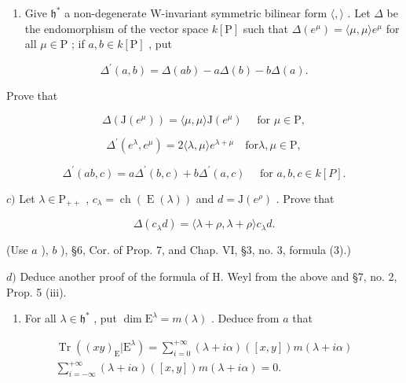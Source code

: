 \begin{enumerate}
\def\labelenumi{\alph{enumi})}
\setcounter{enumi}{1}
\tightlist
\item
  Give \(\mathfrak{h}^*\) a non-degenerate W-invariant symmetric bilinear form \(\langle ,\rangle\) . Let \(\Delta\) be the endomorphism of the vector space \(k[\mathrm{P}]\) such that \(\Delta(e^{\mu}) = \langle \mu ,\mu \rangle e^{\mu}\) for all \(\mu \in \mathrm{P}\) ; if \(a,b\in k[\mathrm{P}]\) , put
\end{enumerate}

\[
\Delta^ {\prime} (a, b) = \Delta (a b) - a \Delta (b) - b \Delta (a).
\]

Prove that

\[
\Delta (\mathrm{J} (e ^ {\mu})) = \langle \mu , \mu \rangle \mathrm{J} (e ^ {\mu}) \quad \text { for } \mu \in \mathrm{P},
\]

\[
\Delta^ {\prime} (e ^ {\lambda}, e ^ {\mu}) = 2 \langle \lambda , \mu \rangle e ^ {\lambda + \mu} \quad \mathrm{for} \lambda , \mu \in \mathrm{P},
\]

\[
\Delta^ {\prime} (a b, c) = a \Delta^ {\prime} (b, c) + b \Delta^ {\prime} (a, c) \quad \text { for } a, b, c \in k [ P ].
\]

\(c)\) Let \(\lambda \in \mathrm{P}_{++}\) , \(c_{\lambda} = \operatorname{ch}(\operatorname{E}(\lambda))\) and \(d = \mathrm{J}(e^{\rho})\) . Prove that

\[
\Delta (c _ {\lambda} d) = \langle \lambda + \rho , \lambda + \rho \rangle c _ {\lambda} d.
\]

(Use \(a\) ), \(b\) ), §6, Cor. of Prop. 7, and Chap. VI, §3, no. 3, formula (3).)

\(d)\) Deduce another proof of the formula of H. Weyl from the above and §7, no. 2, Prop. 5 (iii).

\begin{enumerate}
\def\labelenumi{\alph{enumi})}
\setcounter{enumi}{4}
\tightlist
\item
  For all \(\lambda \in \mathfrak{h}^*\) , put \(\dim \mathrm{E}^{\lambda} = m(\lambda)\) . Deduce from \(a\) that
\end{enumerate}

\[
\begin{array}{c} \operatorname{Tr} ((x y) _ {\mathrm{E}} | \mathrm{E} ^ {\lambda}) = \sum_ {i = 0} ^ {+ \infty} (\lambda + i \alpha) ([ x, y ]) m (\lambda + i \alpha) \\ \sum_ {i = - \infty} ^ {+ \infty} (\lambda + i \alpha) ([ x, y ]) m (\lambda + i \alpha) = 0. \end{array}
\]

